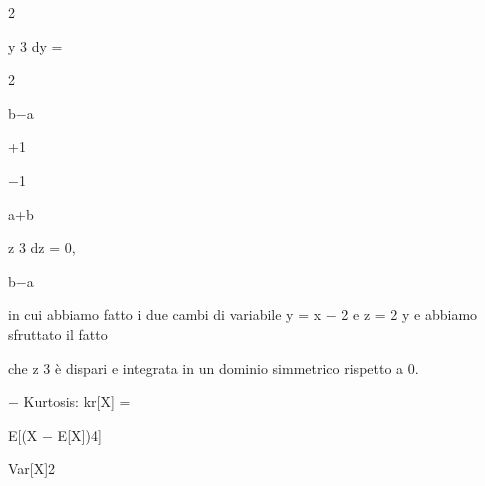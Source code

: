 \documentclass[a4paper,portrait,12pt]{article}
\begin{document}
2





\begin{flushleft}
y 3 dy =
\end{flushleft}





2


\begin{flushleft}
b$-$a
\end{flushleft}





+1


$-$1





\begin{flushleft}
a+b
\end{flushleft}





\begin{flushleft}
z 3 dz = 0,
\end{flushleft}





\begin{flushleft}
b$-$a
\end{flushleft}





\begin{flushleft}
in cui abbiamo fatto i due cambi di variabile y = x $-$ 2 e z = 2 y e abbiamo sfruttato il fatto
\end{flushleft}


\begin{flushleft}
che z 3 \`{e} dispari e integrata in un dominio simmetrico rispetto a 0.
\end{flushleft}


\begin{flushleft}
$-$ Kurtosis: kr[X] =
\end{flushleft}





\begin{flushleft}
E[(X $-$ E[X])4]
\end{flushleft}


\begin{flushleft}
Var[X]2
\end{flushleft}
\end{document}
